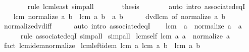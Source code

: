 \begin{isabellebody}
\ \ \ \ \ \ \isamarkupfalse%
\ {\isacharparenleft}{\kern0pt}rule\ lcm{\isacharunderscore}{\kern0pt}least{\isacharparenright}{\kern0pt}\ simp{\isacharunderscore}{\kern0pt}all\isanewline
\ \ \ \ \isamarkupfalse%
\ \isamarkupfalse%
\ {\isacharquery}{\kern0pt}thesis\isanewline
\ \ \ \ \ \ \isamarkupfalse%
\ {\isacharparenleft}{\kern0pt}auto\ intro{\isacharcolon}{\kern0pt}\ associated{\isacharunderscore}{\kern0pt}eqI{\isacharparenright}{\kern0pt}\isanewline
\ \ \isamarkupfalse%
\isanewline
\ \ \isamarkupfalse%
\ {\isachardoublequoteopen}lcm\ {\isacharparenleft}{\kern0pt}normalize\ a{\isacharparenright}{\kern0pt}\ b\ {\isacharequal}{\kern0pt}\ lcm\ a\ b{\isachardoublequoteclose}\ \ a\ b\isanewline
\ \ \ \ \isamarkupfalse%
\ dvd{\isacharunderscore}{\kern0pt}lcm{}\ {\isacharbrackleft}{\kern0pt}of\ {\isachardoublequoteopen}normalize\ a{\isachardoublequoteclose}\ b{\isacharbrackright}{\kern0pt}\ \isamarkupfalse%
\ normalize{\isacharunderscore}{\kern0pt}dvd{\isacharunderscore}{\kern0pt}iff\isanewline
\ \ \ \ \isamarkupfalse%
\ {\isacharparenleft}{\kern0pt}auto\ intro{\isacharcolon}{\kern0pt}\ associated{\isacharunderscore}{\kern0pt}eqI{\isacharparenright}{\kern0pt}\isanewline
\ \ \isamarkupfalse%
\ {\isachardoublequoteopen}lcm\ {}\ a\ {\isacharequal}{\kern0pt}\ normalize\ a{\isachardoublequoteclose}\ \ a\isanewline
\ \ \ \ \isamarkupfalse%
\ {\isacharparenleft}{\kern0pt}rule\ associated{\isacharunderscore}{\kern0pt}eqI{\isacharparenright}{\kern0pt}\ simp{\isacharunderscore}{\kern0pt}all\isanewline
{}\isamarkupfalse%
\ simp{\isacharunderscore}{\kern0pt}all%
\endisatagproof
{\isafoldproof}%
%
\isadelimproof
\isanewline
%
\endisadelimproof
\isanewline
{}\isamarkupfalse%
\ lcm{\isacharunderscore}{\kern0pt}self{\isacharcolon}{\kern0pt}\ {\isachardoublequoteopen}lcm\ a\ a\ {\isacharequal}{\kern0pt}\ normalize\ a{\isachardoublequoteclose}\isanewline
%
\isadelimproof
\ \ %
\endisadelimproof
%
\isatagproof
{}\isamarkupfalse%
\ {\isacharparenleft}{\kern0pt}fact\ lcm{\isachardot}{\kern0pt}idem{\isacharunderscore}{\kern0pt}normalize{\isacharparenright}{\kern0pt}%
\endisatagproof
{\isafoldproof}%
%
\isadelimproof
\isanewline
%
\endisadelimproof
\isanewline
{}\isamarkupfalse%
\ lcm{\isacharunderscore}{\kern0pt}left{\isacharunderscore}{\kern0pt}idem{\isacharcolon}{\kern0pt}\ {\isachardoublequoteopen}lcm\ a\ {\isacharparenleft}{\kern0pt}lcm\ a\ b{\isacharparenright}{\kern0pt}\ {\isacharequal}{\kern0pt}\ lcm\ a\ b{\isachardoublequoteclose}\isanewline

\end{isabellebody}
